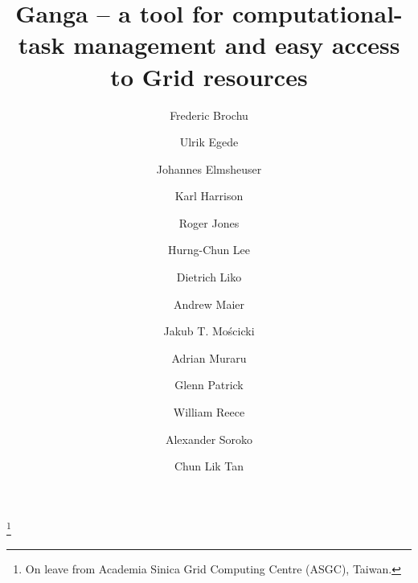 \documentclass{elsart}
\def\grid {Grid\xspace}
\begin{document}
\begin{frontmatter}



\title{Ganga -- a tool for computational-task management and easy access to \grid
  resources}



\author[a:Cambridge]{Frederic Brochu}
\author[a:Imperial]{Ulrik Egede}
\author[a:Munich]{Johannes Elmsheuser}
\author[a:Cambridge]{Karl Harrison}
\author[a:Lancaster]{Roger Jones}
\author[a:CERN]{Hurng-Chun Lee}
\author[a:CERN]{Dietrich Liko}
\author[a:CERN]{Andrew Maier}
\author[a:CERN]{Jakub T. Mo{\'s}cicki}
\author[a:CERN]{Adrian Muraru}
\author[a:STFC]{Glenn Patrick}
\author[a:Imperial]{William Reece}
\author[a:Oxford]{Alexander Soroko}
\author[a:Birmingham]{Chun Lik Tan}

\address[a:Cambridge]{University of Cambridge, Cambridge, United Kingdom}
\address[a:Imperial]{Imperial College London, London, United Kingdom}
\address[a:Munich]{Ludwig-Maximilians-Universit\"{a}t, M\"{u}nchen, Germany}
\address[a:Lancaster]{Lancaster University, Lancaster, United Kingdom}
\address[a:CERN]{CERN, Geneva, Switzerland}
\address[a:STFC]{Science \& Technology Facilities Council, United Kingdom}
\address[a:Oxford]{University of Oxford, Oxford, United Kingdom}
\address[a:Birmingham]{University of Birmingham, Birmingham, United Kingdom}

\thanks[HurngChun]{On leave from Academia Sinica Grid Computing Centre (ASGC),
  Taiwan.}


\end{frontmatter}
\end{document}
